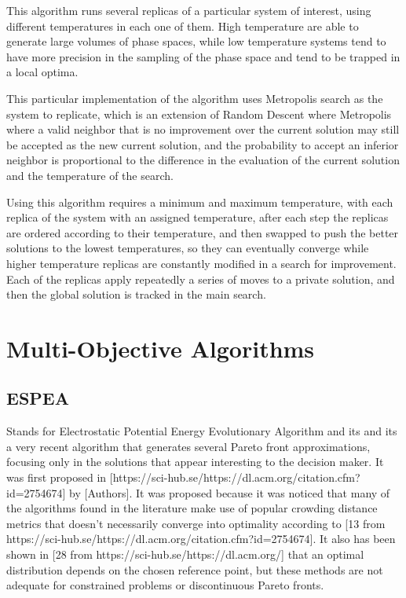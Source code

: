 This algorithm runs several replicas of a particular system of interest, using different temperatures in each one of them. High temperature are able to generate large volumes of phase spaces, while low temperature systems tend to have more precision in the sampling of the phase space and tend to be trapped in a local optima.

This particular implementation of the algorithm uses Metropolis search as the system to replicate, which is an extension of Random Descent where Metropolis where a valid neighbor that is no improvement over the current solution may still be accepted as the new current solution, and the probability to accept an inferior neighbor is proportional to the difference in the evaluation of the current solution and the temperature of the search.

Using this algorithm requires a minimum and maximum temperature, with each replica of the system with an assigned temperature, after each step the replicas are ordered according to their temperature, and then swapped to push the better solutions to the lowest temperatures, so they can eventually converge while higher temperature replicas are constantly modified in a search for improvement. Each of the replicas apply repeatedly a series of moves to a private solution, and then the global solution is tracked in the main search.

\section{Multi-Objective Algorithms}

\subsection{ESPEA}

Stands for Electrostatic Potential Energy Evolutionary Algorithm and its and its a very recent algorithm that generates several Pareto front approximations, focusing only in the solutions that appear interesting to the decision maker. It was first proposed in [https://sci-hub.se/https://dl.acm.org/citation.cfm?id=2754674] by [Authors]. It was proposed because it was noticed that many of the algorithms found in the literature make use of popular crowding distance metrics that doesn't necessarily converge into optimality according to [13 from https://sci-hub.se/https://dl.acm.org/citation.cfm?id=2754674]. It also has been shown in [28 from https://sci-hub.se/https://dl.acm.org/] that an optimal distribution depends on the chosen reference point, but these methods are not adequate for constrained problems or discontinuous Pareto fronts.

